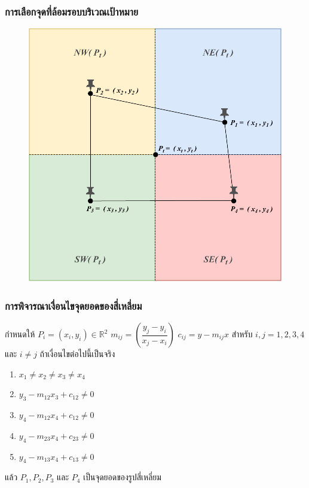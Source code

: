 \documentclass[12pt,aspectratio=169]{beamer}
\begin{document}
\begin{frame}
\frametitle{การเลือกจุดที่ล้อมรอบบริเวณเป้าหมาย}
    \begin{center}
        \begin{figure}
            \includegraphics[scale=0.5]{img/selection.pdf}
        \end{figure}
    \end{center}
\end{frame}

\begin{frame}
    \frametitle{การพิจารณาเงื่อนไขจุดยอดของสี่เหลี่ยม }
\begin{theorem} 
	กำหนดให้ $P_i=(x_i,y_i) \in \mathbb{R}^2$   $m_{ij} =\left(\dfrac{y_j-y_i}{x_j-x_i} \right)$  $c_{ij} = y-m_{ij}x $ สำหรับ $i,j = 1,2,3,4$ และ $i \neq  j$ 
ถ้าเงื่อนไขต่อไปนี้เป็นจริง 
	\begin{enumerate}
\item \label{condition1} $x_{1}  \neq x_{2} \neq x_{3} \neq x_{4}$
\item \label{condition2} $y_3 - m_{12}x_3 + c_{12} \neq 0$
\item \label{condition3} $y_4 - m_{12}x_4 + c_{12} \neq 0$
\item \label{condition4} $y_4 - m_{23}x_4 + c_{23} \neq 0$
\item \label{condition5} $y_4 - m_{13}x_4 + c_{13} \neq 0$
\end{enumerate}
แล้ว $P_1,P_2,P_3$ และ $P_4$ เป็นจุดยอดของรูปสี่เหลี่ยม
\end{theorem}
\end{frame}
\end{document}
